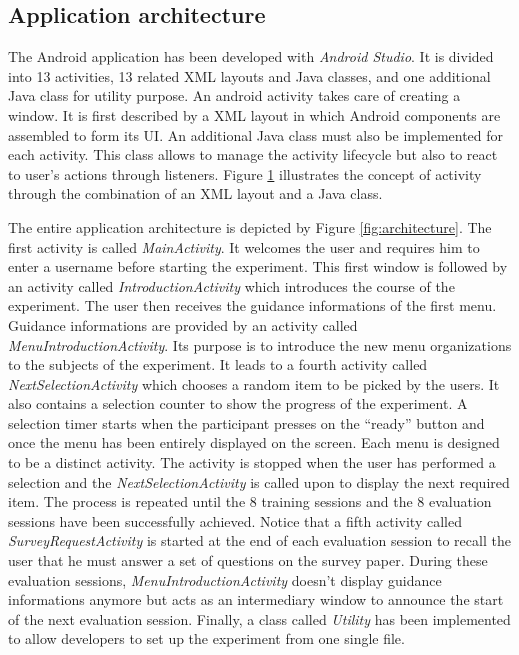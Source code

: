 \subsection{Application architecture}
The Android application has been developed with \textit{Android Studio}. It is 
divided into 13 activities, 13 related XML layouts and Java classes, and one 
additional Java class for utility purpose. An android activity takes care of 
creating a window. It is first described by a XML layout in which Android 
components are assembled to form its UI. An additional Java class must also be 
implemented for each activity. This class allows to manage the activity 
lifecycle but also to react to user’s actions through listeners. Figure 
\ref{fig:activity} illustrates the concept of activity through the combination 
of an XML layout and a Java class.\newline

\begin{figure}[!ht]
    
    \label{fig:activity}
\end{figure}

The entire application architecture is depicted by Figure 
\ref{fig:architecture}. The first activity is called \textit{MainActivity}. It 
welcomes the user and requires him to enter a username before starting the 
experiment. This first window is followed by an activity called 
\textit{IntroductionActivity} which introduces the course of the experiment. 
The 
user then receives the guidance informations of the first menu. Guidance 
informations are provided by an activity called 
\textit{MenuIntroductionActivity}. Its purpose is to introduce 
the new menu organizations to the subjects of the experiment. It leads to a 
fourth activity called \textit{NextSelectionActivity} which chooses a random 
item to be picked by the users. It also contains a selection counter to show 
the progress of the experiment. A selection timer starts when the participant 
presses on the \enquote{ready} button and once the menu has been entirely 
displayed on the screen. Each menu is designed to be a distinct activity. The 
activity is 
stopped when the user has performed a selection and the 
\textit{NextSelectionActivity} is called upon to display the next required item. 
The process is repeated until the 8 training sessions and the 8 evaluation 
sessions have been successfully achieved. Notice that a fifth activity called 
\textit{SurveyRequestActivity} is started at the end of each evaluation session 
to recall the user that he must answer a set of questions on the survey paper. 
During these evaluation sessions, \textit{MenuIntroductionActivity} doesn't 
display guidance informations anymore but acts as an intermediary window to 
announce the start of the next evaluation session. Finally, a class called 
\textit{Utility} has been implemented to allow developers to set up the 
experiment from one single file.\newline

